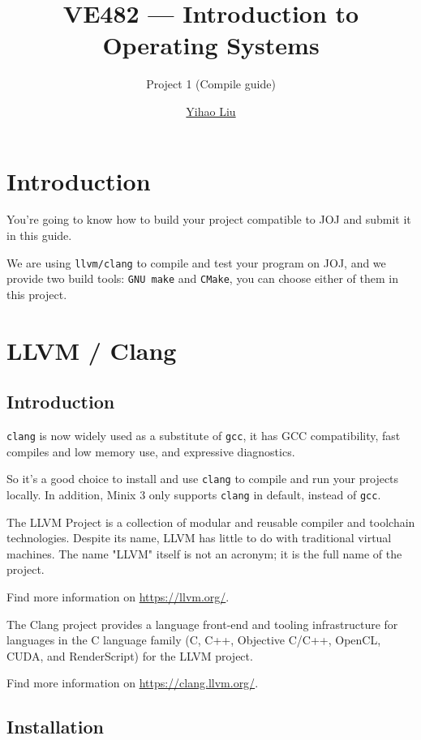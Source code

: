 \documentclass[11pt,a4paper]{article}
\title{VE482 --- Introduction to\\ Operating Systems}
\subtitle{Project 1 (Compile guide)}
\author{\href{mailto:liuyh615@sjtu.edu.cn}{Yihao Liu}}
\begin{document}
\maketitle

\section{Introduction}

You're going to know how to build your project compatible to JOJ and submit it in this guide. \smallskip

\noindent We are using \texttt{llvm/clang} to compile and test your program on JOJ, and we provide two build tools: \texttt{GNU make} and \texttt{CMake}, you can choose either of them in this project.

\section{LLVM / Clang}

\subsection{Introduction}

\texttt{clang} is now widely used as a substitute of \texttt{gcc}, it has GCC compatibility, fast compiles and low memory use, and expressive diagnostics. \smallskip

\noindent So it's a good choice to install and use \texttt{clang} to compile and run your projects locally. In addition, Minix 3 only supports \texttt{clang} in default, instead of \texttt{gcc}. \bigskip

\noindent The LLVM Project is a collection of modular and reusable compiler and toolchain technologies. Despite its name, LLVM has little to do with traditional virtual machines. The name "LLVM" itself is not an acronym; it is the full name of the project. \smallskip

\noindent Find more information on \url{https://llvm.org/}. \bigskip

\noindent The Clang project provides a language front-end and tooling infrastructure for languages in the C language family (C, C++, Objective C/C++, OpenCL, CUDA, and RenderScript) for the LLVM project. \smallskip

\noindent Find more information on \url{https://clang.llvm.org/}.

\subsection{Installation}
\end{document}
